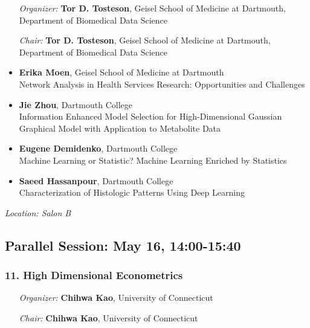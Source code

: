 \begin{enumerate}[align=left]
\item [\emph{Organizer:}] \textbf{Tor D. Tosteson}, Geisel School of Medicine at Dartmouth, Department of Biomedical Data Science
\item [\emph{Chair:}] \textbf{Tor D. Tosteson}, Geisel School of Medicine at Dartmouth, Department of Biomedical Data Science
\end{enumerate}

\begin{itemize}
\item \textbf{Erika Moen}, Geisel School of Medicine at Dartmouth \\
Network Analysis in Health Services Research: Opportunities and Challenges
\item \textbf{Jie Zhou}, Dartmouth College \\
Information Enhanced Model Selection for High-Dimensional Gaussian Graphical Model with Application to Metabolite Data
\item \textbf{Eugene Demidenko}, Dartmouth College \\
Machine Learning or Statistic? Machine Learning Enriched by Statistics
\item \textbf{Saeed Hassanpour}, Dartmouth College \\
Characterization of Histologic Patterns Using Deep Learning
\end{itemize}

\emph{Location: Salon B}

\subsection*{Parallel Session: May 16, 14:00-15:40}

\subsubsection*{11. High Dimensional Econometrics}

\begin{enumerate}[align=left]
\item [\emph{Organizer:}] \textbf{Chihwa Kao}, University of Connecticut
\item [\emph{Chair:}] \textbf{Chihwa Kao}, University of Connecticut
\end{enumerate}

